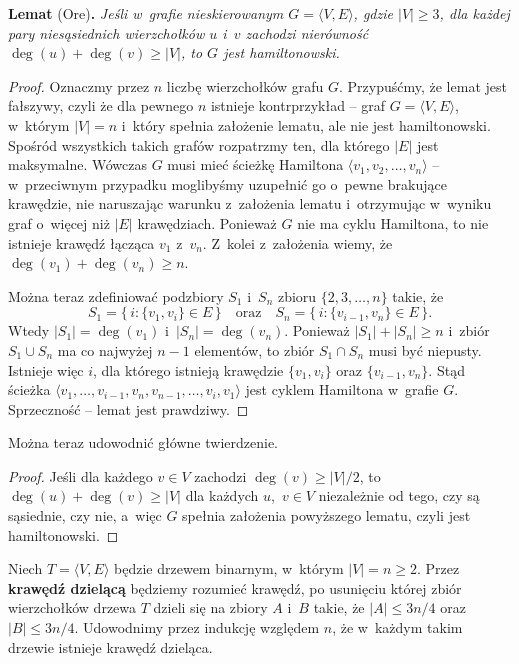 \medskip
\noindent\textsf{\textbf{Lemat} (Ore)\textbf{.}} \textit{Jeśli w~grafie nieskierowanym\/ $G=\langle V,E\rangle$, gdzie\/ $|V|\ge3$, dla każdej pary niesąsiednich wierzchołków\/ $u$ i~\/$v$ zachodzi nierówność\/ $\deg(u)+\deg(v)\ge|V|$, to\/ $G$ jest hamiltonowski.}
\begin{proof}
Oznaczmy przez $n$ liczbę wierzchołków grafu $G$.
Przypuśćmy, że lemat jest fałszywy, czyli że dla pewnego $n$ istnieje kontrprzykład -- graf $G=\langle V,E\rangle$, w~którym $|V|=n$ i~który spełnia założenie lematu, ale nie jest hamiltonowski.
Spośród wszystkich takich grafów rozpatrzmy ten, dla którego $|E|$ jest maksymalne.
Wówczas $G$ musi mieć ścieżkę Hamiltona $\langle v_1,v_2,\dots,v_n\rangle$ -- w~przeciwnym przypadku moglibyśmy uzupełnić go o~pewne brakujące krawędzie, nie naruszając warunku z~założenia lematu i~otrzymując w~wyniku graf o~więcej niż $|E|$ krawędziach.
Ponieważ $G$ nie ma cyklu Hamiltona, to nie istnieje krawędź łącząca $v_1$ z~$v_n$.
Z~kolei z~założenia wiemy, że $\deg(v_1)+\deg(v_n)\ge n$.

Można teraz zdefiniować podzbiory $S_1$ i~$S_n$ zbioru $\{2,3,\dots,n\}$ takie, że
\[
	S_1 = \bigl\{\,i:\{v_1,v_i\}\in E\,\bigr\} \quad\text{oraz}\quad S_n = \bigl\{\,i:\{v_{i-1},v_n\}\in E\,\bigr\}.
\]
Wtedy $|S_1|=\deg(v_1)$ i~$|S_n|=\deg(v_n)$.
Ponieważ $|S_1|+|S_n|\ge n$ i~zbiór $S_1\cup S_n$ ma co najwyżej $n-1$ elementów, to zbiór $S_1\cap S_n$ musi być niepusty.
Istnieje więc $i$, dla którego istnieją krawędzie $\{v_1,v_i\}$ oraz $\{v_{i-1},v_n\}$.
Stąd ścieżka $\langle v_1,\dots,v_{i-1},v_n,v_{n-1},\dots,v_i,v_1\rangle$ jest cyklem Hamiltona w~grafie $G$.
Sprzeczność -- lemat jest prawdziwy.
\end{proof}

Można teraz udowodnić główne twierdzenie.
\begin{proof}
Jeśli dla każdego $v\in V$ zachodzi $\deg(v)\ge|V|/2$, to $\deg(u)+\deg(v)\ge|V|$ dla każdych $u$,~$v\in V$ niezależnie od tego, czy są sąsiednie, czy nie, a~więc $G$ spełnia założenia powyższego lematu, czyli jest hamiltonowski.
\end{proof}


\subproblem %
Niech $T=\langle V,E\rangle$ będzie drzewem binarnym, w~którym $|V|=n\ge2$.
Przez \textbf{krawędź dzielącą} będziemy rozumieć krawędź, po usunięciu której zbiór wierzchołków drzewa $T$ dzieli się na zbiory $A$ i~$B$ takie, że $|A|\le3n/4$ oraz $|B|\le3n/4$.
Udowodnimy przez indukcję względem $n$, że w~każdym takim drzewie istnieje krawędź dzieląca.

